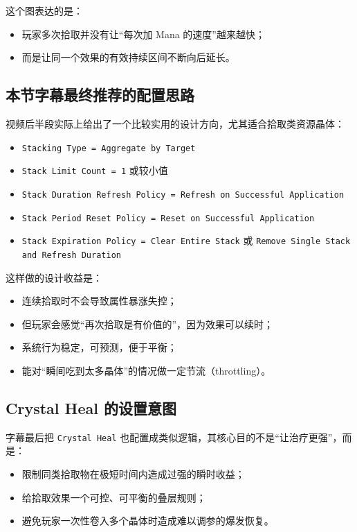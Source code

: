 这个图表达的是：
\begin{itemize}
	\item 玩家多次拾取并没有让“每次加 Mana 的速度”越来越快；
	\item 而是让同一个效果的有效持续区间不断向后延长。
\end{itemize}

\subsection{本节字幕最终推荐的配置思路}

视频后半段实际上给出了一个比较实用的设计方向，尤其适合拾取类资源晶体：

\begin{itemize}
	\item \texttt{Stacking Type = Aggregate by Target}
	\item \texttt{Stack Limit Count = 1} 或较小值
	\item \texttt{Stack Duration Refresh Policy = Refresh on Successful Application}
	\item \texttt{Stack Period Reset Policy = Reset on Successful Application}
	\item \texttt{Stack Expiration Policy = Clear Entire Stack} 或 \texttt{Remove Single Stack and Refresh Duration}
\end{itemize}

这样做的设计收益是：
\begin{itemize}
	\item 连续拾取时不会导致属性暴涨失控；
	\item 但玩家会感觉“再次拾取是有价值的”，因为效果可以续时；
	\item 系统行为稳定，可预测，便于平衡；
	\item 能对“瞬间吃到太多晶体”的情况做一定节流（throttling）。
\end{itemize}

\subsection{Crystal Heal 的设置意图}

字幕最后把 \texttt{Crystal Heal} 也配置成类似逻辑，其核心目的不是“让治疗更强”，而是：

\begin{itemize}
	\item 限制同类拾取物在极短时间内造成过强的瞬时收益；
	\item 给拾取效果一个可控、可平衡的叠层规则；
	\item 避免玩家一次性卷入多个晶体时造成难以调参的爆发恢复。
\end{itemize}

